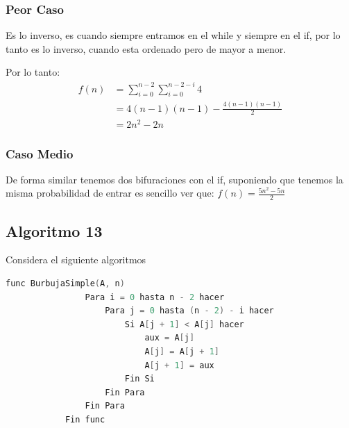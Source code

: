 \documentclass[12pt, fleqn]{article}                            %
\theoremstyle{break}                                            %
\begin{document}
        \subsubsection{Peor Caso}


            Es lo inverso, es cuando siempre entramos en el while y siempre en el if, por lo tanto
            es lo inverso, cuando esta ordenado pero de mayor a menor.

            Por lo tanto:
            \begin{align*}
                f(n)
                    &= \sum_{i = 0}^{n - 2} \sum_{i = 0}^{n - 2 - i} 4      \\
                    &= 4(n-1)(n-1) - \frac{4(n-1)(n-1)}{2}                  \\
                    &= 2n^2 - 2n 
            \end{align*}



        \subsubsection{Caso Medio}

            De forma similar tenemos dos bifuraciones con el if, suponiendo que tenemos la misma
            probabilidad de entrar es sencillo ver que:
            $f(n) = \frac{5n^2 - 5n}{2}$



    \clearpage
    \subsection{Algoritmo 13}

        Considera el siguiente algoritmos
        \begin{lstlisting}[language=C, gobble=12, basicstyle=\small\color{white}]
            func BurbujaSimple(A, n)
                Para i = 0 hasta n - 2 hacer            
                    Para j = 0 hasta (n - 2) - i hacer  
                        Si A[j + 1] < A[j] hacer        
                            aux = A[j]
                            A[j] = A[j + 1]
                            A[j + 1] = aux
                        Fin Si                          
                    Fin Para
                Fin Para
            Fin func
        \end{lstlisting}
\end{document}
